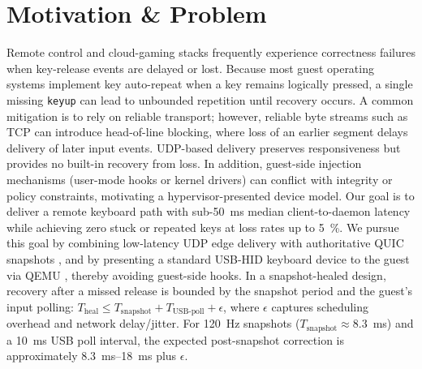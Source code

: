 \documentclass[11pt]{article}
\begin{document}
\section{Motivation \& Problem}
Remote control and cloud-gaming stacks frequently experience correctness failures when key-release events are delayed or lost. Because most guest operating systems implement key auto-repeat when a key remains logically pressed, a single missing \texttt{keyup} can lead to unbounded repetition until recovery occurs. A common mitigation is to rely on reliable transport; however, reliable byte streams such as TCP \citep{rfc9293} can introduce head-of-line blocking, where loss of an earlier segment delays delivery of later input events. UDP-based delivery preserves responsiveness but provides no built-in recovery from loss. In addition, guest-side injection mechanisms (user-mode hooks or kernel drivers) can conflict with integrity or policy constraints, motivating a hypervisor-presented device model.
Our goal is to deliver a remote keyboard path with sub-\SI{50}{ms} median client-to-daemon latency while achieving zero stuck or repeated keys at loss rates up to \SI{5}{\percent}. We pursue this goal by combining low-latency UDP edge delivery with authoritative QUIC snapshots \citep{rfc9000,rfc9001}, and by presenting a standard USB-HID keyboard device to the guest \citep{usb_hid} via QEMU \citep{qemu}, thereby avoiding guest-side hooks.
In a snapshot-healed design, recovery after a missed release is bounded by the snapshot period and the guest's input polling: \(T_{\mathrm{heal}} \le T_{\mathrm{snapshot}} + T_{\mathrm{USB\text{-}poll}} + \epsilon\), where \(\epsilon\) captures scheduling overhead and network delay/jitter. For \SI{120}{Hz} snapshots (\(T_{\mathrm{snapshot}}\approx\)\SI{8.3}{ms}) and a \SI{10}{ms} USB poll interval, the expected post-snapshot correction is approximately \SIrange{8.3}{18}{ms} plus \(\epsilon\).
\end{document}
